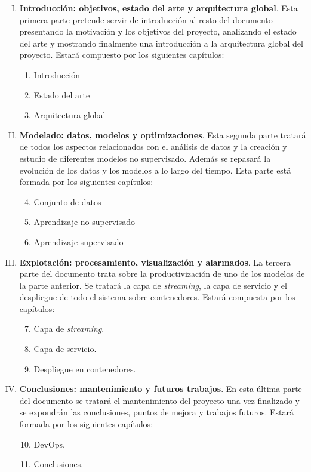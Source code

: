 \begin{enumerate}[I.]
\item \textbf{Introducción: objetivos, estado del arte y arquitectura global}.  Esta primera parte pretende servir de introducción al resto del documento presentando la motivación y los objetivos del proyecto, analizando el estado del arte y mostrando finalmente una introducción a la arquitectura global del proyecto. Estará compuesto por los siguientes capítulos:

\begin{enumerate}[1.]
\item Introducción
\item Estado del arte
\item Arquitectura global
\end{enumerate}

\item \textbf{Modelado: datos, modelos y optimizaciones}. Esta segunda parte tratará de todos los aspectos relacionados con el análisis de datos y la creación y estudio de diferentes modelos no supervisado. Además se repasará la evolución de los datos y los modelos a lo largo del tiempo. Esta parte está formada por los siguientes capítulos:

\begin{enumerate}[1.]
\setcounter{enumii}{3}
\item Conjunto de datos
\item Aprendizaje no supervisado
\item Aprendizaje supervisado 
\end{enumerate}


\item \textbf{Explotación: procesamiento, visualización y alarmados}. La tercera parte del documento trata sobre la productivización de uno de los modelos de la parte anterior. Se tratará la capa de \textit{streaming}, la capa de servicio y el despliegue de todo el sistema sobre contenedores.  Estará compuesta por los capítulos:
\begin{enumerate}[1.]
\setcounter{enumii}{6}
\item Capa de \textit{streaming}.
\item Capa de servicio. 
\item Despliegue en contenedores. 
\end{enumerate}
\item \textbf{Conclusiones: mantenimiento y futuros trabajos}. En esta última parte del documento se tratará el mantenimiento del proyecto una vez finalizado y se expondrán las conclusiones, puntos de mejora y trabajos futuros. Estará formada por los siguientes capítulos:
\begin{enumerate}[1.]
\setcounter{enumii}{9}
\item DevOps.
\item Conclusiones. 
\end{enumerate}
\end{enumerate}


